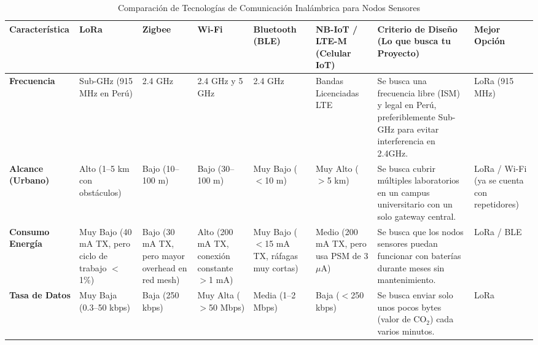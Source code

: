 \begin{landscape}
    \begin{table}[h!]
        \centering
        \renewcommand{\arraystretch}{1.3}
        \fontsize{9}{10}\selectfont
        \caption{Comparación de Tecnologías de Comunicación Inalámbrica para Nodos Sensores}
        \label{tabla:comparativa_comunicacion}
        \begin{tabular}{|p{2.5cm}|p{2.5cm}|p{2cm}|p{2cm}|p{2.5cm}|p{2.5cm}|p{4.5cm}|p{2cm}|}
            \hline
            \textbf{Característica}     & \textbf{LoRa}                                     & \textbf{Zigbee}                                  & \textbf{Wi-Fi}                               & \textbf{Bluetooth (BLE)}                   & \textbf{NB-IoT / LTE-M (Celular IoT)}       & \textbf{Criterio de Diseño (Lo que busca tu Proyecto)}                                                            & \textbf{Mejor Opción}                       \\ \hline
            \textbf{Frecuencia}         & Sub-GHz (915 MHz en Perú)                         & 2.4 GHz                                          & 2.4 GHz y 5 GHz                              & 2.4 GHz                                    & Bandas Licenciadas LTE                      & Se busca una frecuencia libre (ISM) y legal en Perú, preferiblemente Sub-GHz para evitar interferencia en 2.4GHz. & LoRa (915 MHz)                              \\ \hline
            \textbf{Alcance (Urbano)}   & Alto (1--5 km con obstáculos)                     & Bajo (10--100 m)                                 & Bajo (30--100 m)                             & Muy Bajo ($<$10 m)                         & Muy Alto ($>$5 km)                          & Se busca cubrir múltiples laboratorios en un campus universitario con un solo gateway central.                    & LoRa / Wi-Fi (ya se cuenta con repetidores) \\ \hline
            \textbf{Consumo Energía}    & Muy Bajo (40 mA TX, pero ciclo de trabajo $<$1\%) & Bajo (30 mA TX, pero mayor overhead en red mesh) & Alto (200 mA TX, conexión constante $>$1 mA) & Muy Bajo ($<$15 mA TX, ráfagas muy cortas) & Medio (200 mA TX, pero usa PSM de 3 $\mu$A) & Se busca que los nodos sensores puedan funcionar con baterías durante meses sin mantenimiento.                    & LoRa / BLE                                  \\ \hline
            \textbf{Tasa de Datos}      & Muy Baja (0.3--50 kbps)                           & Baja (250 kbps)                                  & Muy Alta ($>$50 Mbps)                        & Media (1--2 Mbps)                          & Baja ($<$250 kbps)                          & Se busca enviar solo unos pocos bytes (valor de CO$_2$) cada varios minutos.                                      & LoRa                                        \\ \hline

\end{tabular}
\end{table}
\end{landscape}
